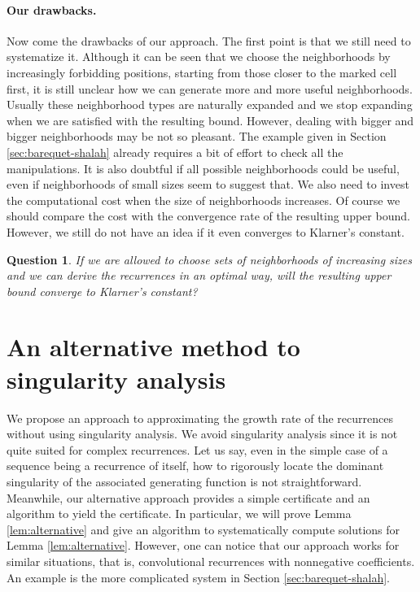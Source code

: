 \documentclass[a4paper,12pt]{article}
\newtheorem{question}{Question}
\begin{document}
\paragraph{Our drawbacks.} Now come the drawbacks of our approach. The first point is that we still need to systematize it. Although it can be seen that we choose the neighborhoods by increasingly forbidding positions, starting from those closer to the marked cell first, it is still unclear how we can generate more and more useful neighborhoods. Usually these neighborhood types are naturally expanded and we stop expanding when we are satisfied with the resulting bound. However, dealing with bigger and bigger neighborhoods may be not so pleasant. The example given in Section \ref{sec:barequet-shalah} already requires a bit of effort to check all the manipulations. It is also doubtful if all possible neighborhoods could be useful, even if neighborhoods of small sizes seem to suggest that. We also need to invest the computational cost when the size of neighborhoods increases. Of course we should compare the cost with the convergence rate of the resulting upper bound. However, we still do not have an idea if it even converges to Klarner's constant.

\begin{question}
    If we are allowed to choose sets of neighborhoods of increasing sizes and we can derive the recurrences in an optimal way, will the resulting upper bound converge to Klarner's constant?
\end{question}

\section{An alternative method to singularity analysis} \label{sec:alternative}

We propose an approach to approximating the growth rate of the recurrences without using singularity analysis. We avoid singularity analysis since it is not quite suited for complex recurrences. Let us say, even in the simple case of a sequence being a recurrence of itself, how to rigorously locate the dominant singularity of the associated generating function is not straightforward. Meanwhile, our alternative approach provides a simple certificate and an algorithm to yield the certificate. In particular, we will prove Lemma \ref{lem:alternative} and give an algorithm to systematically compute solutions for Lemma \ref{lem:alternative}.
However, one can notice that our approach works for similar situations, that is, convolutional recurrences with nonnegative coefficients. An example is the more complicated system in Section \ref{sec:barequet-shalah}.
\end{document}
